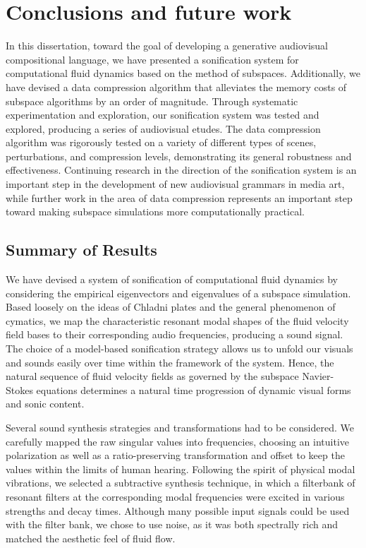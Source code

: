 \chapter[Conclusions and future work]{Conclusions and future work}
\label{chap:chap7}

In this dissertation, toward the goal of developing a generative audiovisual compositional language, we have presented a sonification system for computational fluid dynamics
based on the method of subspaces. Additionally, we have devised a data compression algorithm that alleviates the memory costs of subspace algorithms by an order of magnitude. Through
systematic experimentation and exploration, our sonification system was tested and explored, producing a series of audiovisual etudes. The data compression algorithm was rigorously tested 
on a variety of different types of scenes, perturbations, and compression levels, demonstrating its general robustness and effectiveness. Continuing research in the direction of the sonification
system is an important step in the development of new audiovisual grammars in media art, while further work in the area of data compression represents an important step toward
making subspace simulations more computationally practical.

 \section{Summary of Results}
 We have devised a system of sonification of computational fluid dynamics by considering the empirical eigenvectors and eigenvalues of a subspace simulation. Based loosely on the ideas of 
 Chladni plates and the general phenomenon of cymatics, we map the characteristic resonant modal shapes of the fluid velocity field bases to their corresponding audio frequencies,
 producing a sound signal. The choice of a model-based sonification strategy allows us to unfold our visuals and sounds easily over time within the framework of the system. Hence, the natural
 sequence of fluid velocity fields as governed by the subspace Navier-Stokes equations determines a natural time progression of dynamic visual forms and sonic content. 
 
 Several sound synthesis strategies and transformations had to be considered. We carefully mapped the raw singular values into frequencies,
 choosing an intuitive polarization as well as a ratio-preserving transformation and offset to keep the values within the limits of human hearing. Following the spirit of physical modal vibrations, we 
 selected a subtractive synthesis technique, in which a filterbank of resonant filters at the corresponding modal frequencies were excited in various strengths and decay times. Although many possible
 input signals could be used with the filter bank, we chose to use noise, as it was both spectrally rich and matched the aesthetic feel of fluid flow.


